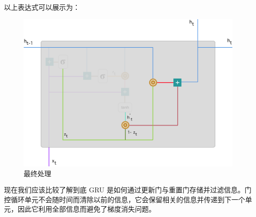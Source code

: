 \documentclass{article}
\begin{document}
以上表达式可以展示为：

\begin{figure}[H]
	\centering
	\includegraphics[scale=0.2]{GRU7.png}
	\caption{最终处理}
\end{figure}
现在我们应该比较了解到底 GRU 是如何通过更新门与重置门存储并过滤信息。门控循环单元不会随时间而清除以前的信息，它会保留相关的信息并传递到下一个单元，因此它利用全部信息而避免了梯度消失问题。
\end{document}
